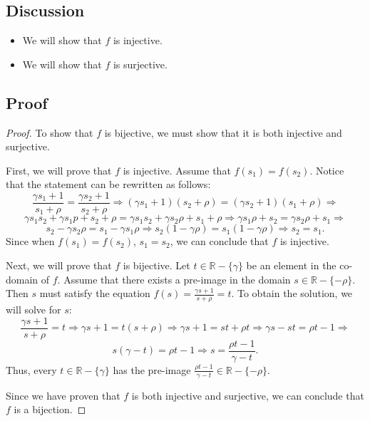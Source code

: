 \documentclass{article}
\begin{document}
\subsection*{Discussion}
\begin{itemize}
    \item We will show that $ f $ is injective.
    \item We will show that $ f $ is surjective.
\end{itemize}

\subsection*{Proof}
\begin{proof}
    To show that $ f $ is bijective, we must show that it is both injective and surjective.

    \noindent First, we will prove that $ f $ is injective. Assume that $ f(s_1) = f(s_2) $. Notice that the statement can be rewritten as follows:
    \[
        \frac{\gamma s_1 + 1}{s_1 + \rho} = \frac{\gamma s_2 + 1}{s_2 + \rho} \Rightarrow (\gamma s_1 + 1)(s_2 + \rho) = (\gamma s_2 + 1)(s_1 + \rho) \Rightarrow
    \]
    \[
        \gamma s_1 s_2 + \gamma s_1 p + s_2 + \rho = \gamma s_1 s_2 + \gamma s_2 \rho + s_1 + \rho \Rightarrow \gamma s_1 \rho + s_2 = \gamma s_2 \rho + s_1 \Rightarrow
    \]
    \[
        s_2 - \gamma s_2 \rho = s_1 - \gamma s_1 \rho \Rightarrow s_2 (1 - \gamma \rho) = s_1 (1 - \gamma \rho) \Rightarrow s_2 = s_1.
    \]
    Since when $ f(s_1) = f(s_2) $, $ s_1 = s_2 $, we can conclude that $ f $ is injective.

    \noindent Next, we will prove that $ f $ is bijective. Let $ t \in \mathbb{R}-\{\gamma\} $ be an element in the co-domain of $ f $. Assume that there exists a pre-image in the domain $ s \in \mathbb{R}-\{-\rho\} $.
    Then $ s $ must satisfy the equation $ f(s) = \frac{\gamma s + 1}{s + \rho} = t $. To obtain the solution, we will solve for $ s $:
    \[
        \frac{\gamma s + 1}{s + \rho} = t \Rightarrow \gamma s + 1 = t (s + \rho) \Rightarrow \gamma s + 1 = st + \rho t \Rightarrow \gamma s - st = \rho t - 1 \Rightarrow
    \]
    \[
        s (\gamma - t) = \rho t - 1 \Rightarrow s = \frac{\rho t - 1}{\gamma - t}.
    \]
    Thus, every $ t \in \mathbb{R}-\{\gamma\} $ has the pre-image $ \frac{\rho t - 1}{\gamma - t} \in \mathbb{R}-\{-\rho\} $.

    \noindent Since we have proven that $ f $ is both injective and surjective, we can conclude that $ f $ is a bijection.
\end{proof}
\end{document}
